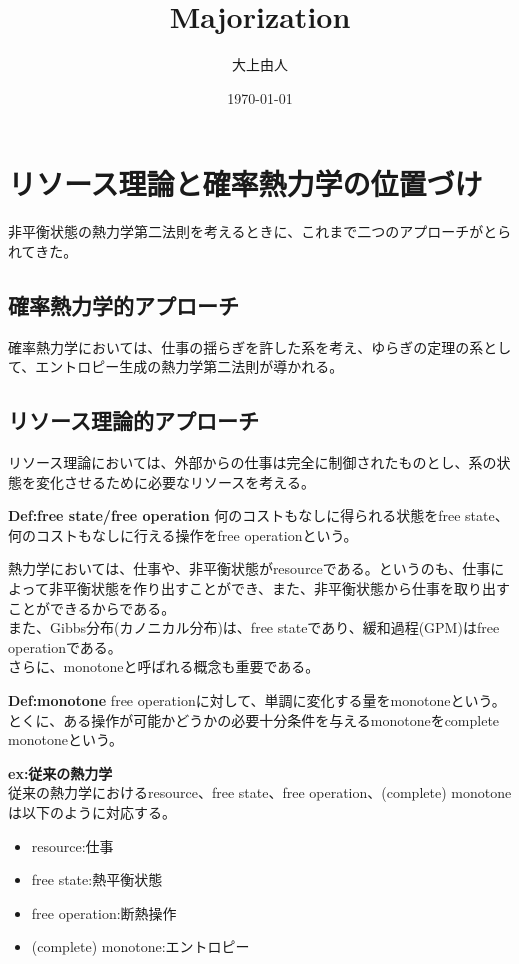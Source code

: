 \documentclass[a4paper,11pt]{jsarticle}
\numberwithin{equation}{section}
\begin{document}
\title{Majorization}
\author{大上由人}
\date{\today}
\maketitle

\tableofcontents
\newpage

\section{リソース理論と確率熱力学の位置づけ}
非平衡状態の熱力学第二法則を考えるときに、これまで二つのアプローチがとられてきた。\\
\subsection{確率熱力学的アプローチ}
確率熱力学においては、仕事の揺らぎを許した系を考え、ゆらぎの定理の系として、エントロピー生成の熱力学第二法則が導かれる。\\

\subsection{リソース理論的アプローチ}
リソース理論においては、外部からの仕事は完全に制御されたものとし、系の状態を変化させるために必要なリソースを考える。\\
\begin{itembox}[l]{\textbf{Def:free state/free operation}}
    何のコストもなしに得られる状態をfree state、何のコストもなしに行える操作をfree operationという。
\end{itembox}
熱力学においては、仕事や、非平衡状態がresourceである。というのも、仕事によって非平衡状態を作り出すことができ、また、非平衡状態から仕事を取り出すことができるからである。\\
また、Gibbs分布(カノニカル分布)は、free stateであり、緩和過程(GPM)はfree operationである。\\

さらに、monotoneと呼ばれる概念も重要である。\\
\begin{itembox}[l]{\textbf{Def:monotone}}
    free operationに対して、単調に変化する量をmonotoneという。とくに、ある操作が可能かどうかの必要十分条件を与えるmonotoneをcomplete monotoneという。
\end{itembox}
\textbf{ex:従来の熱力学}\\
従来の熱力学におけるresource、free state、free operation、(complete) monotoneは以下のように対応する。\\
\begin{itemize}
    \item resource:仕事
    \item free state:熱平衡状態
    \item free operation:断熱操作
    \item (complete) monotone:エントロピー
\end{itemize}
\end{document}
